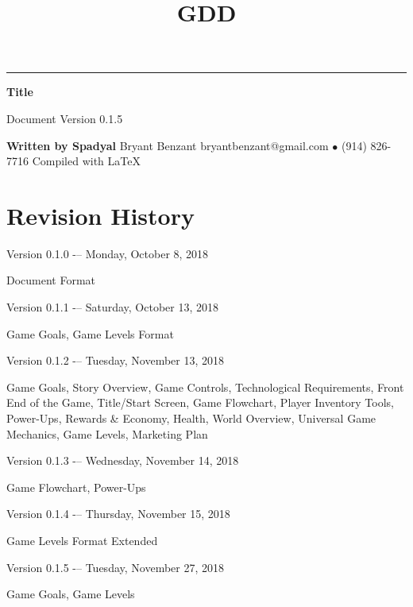 \documentclass[12pt]{article}
\title{GDD}
\begin{document}
\begin{titlepage}
\end{titlepage}

\clearpage
\setcounter{page}{2}

\begin{center}
\vspace{0.15in}
\hrule
\vspace{0.15in}
\textbf{Title} \par
\vspace{0.15in}
Document Version 0.1.5 \par
\end{center}
\textbf{Written by Spadyal} \newline \newline
Bryant Benzant \newline \newline
bryantbenzant@gmail.com $\bullet$ (914) 826-7716 \newline \newline
Compiled with \LaTeX
\newpage

\twocolumn
\tableofcontents
\newpage

\twocolumn
\section{Revision History}
\noindent Version 0.1.0 -– Monday, October 8, 2018
\begin{addmargin}[5mm]{0em}
Document Format
\end{addmargin}
\noindent Version 0.1.1 -– Saturday, October 13, 2018
\begin{addmargin}[5mm]{0em}
Game Goals, Game Levels Format
\end{addmargin}
\noindent Version 0.1.2 -– Tuesday, November 13, 2018
\begin{addmargin}[5mm]{0em}
Game Goals, Story Overview, Game Controls, Technological Requirements, Front End of the Game, Title/Start Screen, Game Flowchart, Player Inventory Tools, Power-Ups, Rewards \& Economy, Health, World Overview, Universal Game Mechanics, Game Levels, Marketing Plan
\end{addmargin}
\noindent Version 0.1.3 -– Wednesday, November 14, 2018
\begin{addmargin}[5mm]{0em}
Game Flowchart, Power-Ups
\end{addmargin}
\noindent Version 0.1.4 -– Thursday, November 15, 2018
\begin{addmargin}[5mm]{0em}
Game Levels Format Extended
\end{addmargin}
\noindent Version 0.1.5 -– Tuesday, November 27, 2018
\begin{addmargin}[5mm]{0em}
Game Goals, Game Levels
\end{addmargin}
\begin{addmargin}[5mm]{0em}

\end{addmargin}
\onecolumn
\end{document}
